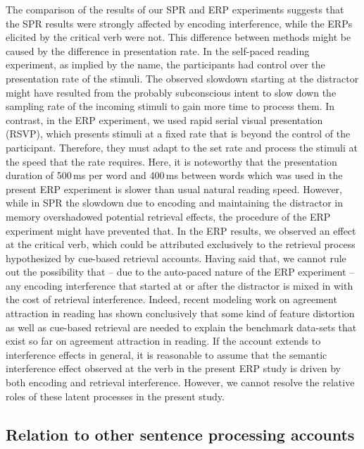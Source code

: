 \documentclass[a4paper, man, floatsintext]{apa7}
\begin{document}
The comparison of the results of our SPR and ERP experiments suggests that the SPR results were strongly affected by encoding interference, while the ERPs elicited by the critical verb were not. This difference between methods might be caused by the difference in presentation rate. In the self-paced reading experiment, as implied by the name, the participants had control over the presentation rate of the stimuli. The observed slowdown starting at the distractor  might have resulted from the probably subconscious intent to slow down the sampling rate of the incoming stimuli to gain more time to process them. In contrast, in the ERP experiment, we used rapid serial visual presentation (RSVP), which presents stimuli at a fixed rate that is beyond the control of the participant. Therefore, they must adapt to the set rate and process the stimuli at the speed that the rate requires. Here, it is noteworthy that the presentation duration of 500\,ms per word and 400\,ms between words which was used in the present ERP experiment is slower than usual natural reading speed. However, while in SPR the slowdown due to encoding and maintaining the distractor in memory overshadowed potential retrieval effects, the procedure of the ERP experiment might have prevented that. In the ERP results, we observed an effect at the critical verb, which could be attributed exclusively to the retrieval process hypothesized by cue-based retrieval accounts. Having said that, we cannot rule out the possibility that -- due to the auto-paced nature of the ERP experiment -- any encoding interference that started at or after the distractor is mixed in with the cost of retrieval interference. Indeed, recent modeling work on agreement attraction in reading \parencite{Yadavetal2022} has shown conclusively that some kind of feature distortion as well as cue-based retrieval are needed to explain the benchmark data-sets that exist so far on agreement attraction in reading. If the  \textcite{Yadavetal2022} account extends to interference effects in general, 
it is reasonable to assume that the semantic interference effect observed at the verb in the present ERP study is driven by both encoding and retrieval interference. However, we cannot resolve the relative roles of these latent processes in the present study.

\subsection{Relation to other sentence processing accounts}
\end{document}
